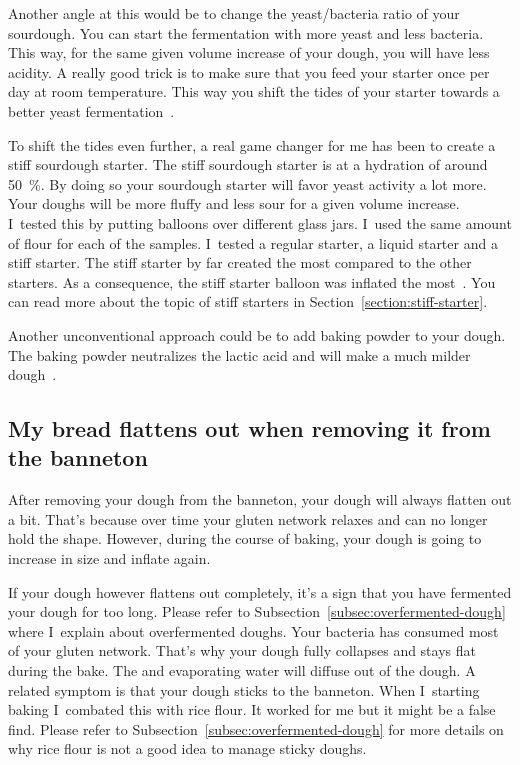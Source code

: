 Another angle at this would be to change the yeast/bacteria
ratio of your sourdough. You can start the fermentation with
more yeast and less bacteria. This way, for the same given
volume increase of your dough, you will have less acidity.
A really good trick is to make sure that you feed your starter
once per day at room temperature. This way you shift
the tides of your starter towards a better yeast fermentation~\cite*{more+active+starter}.

To shift the tides even further, a real game changer
for me has been to create a stiff sourdough starter. The
stiff sourdough starter is at a hydration of around \qty{50}{\percent}.
By doing so your sourdough starter will favor yeast
activity a lot more. Your doughs will be more fluffy and less
sour for a given volume increase. I~tested this
by putting balloons over different glass jars. I~used
the same amount of flour for each of the samples.
I~tested a regular starter, a liquid starter and a stiff
starter. The stiff starter by far created the most 
compared to the other starters. As a consequence, the stiff
starter balloon was inflated the most~\cite{stiff+starter}. You can read more
about the topic of stiff starters in Section~\ref{section:stiff-starter}.

Another unconventional approach could be to add baking
powder to your dough. The baking powder neutralizes the
lactic acid and will make a much milder
dough~\cite{baking+powder+reduce-acidity}.

\subsection{My bread flattens out when removing it from the banneton}

After removing your dough from the banneton, your dough will always
flatten out a bit. That's because over time your gluten network
relaxes and can no longer hold the shape. However, during the course
of baking, your dough is going to increase in size and inflate again.

If your dough however flattens out completely, it's a sign that
you have fermented your dough for too long. Please refer to
Subsection~\ref{subsec:overfermented-dough}
where I~explain about overfermented doughs. Your bacteria
has consumed most of your gluten network. That's why your
dough fully collapses and stays flat during the bake. The
 and evaporating water will diffuse out of the dough.
A related symptom is that your dough sticks to the banneton.
When I~starting baking I~combated this with rice flour.
It worked for me but it might be a false find. Please refer to
Subsection~\ref{subsec:overfermented-dough} for more details on why
rice flour is not a good idea to manage sticky doughs.

